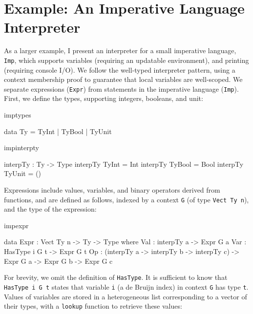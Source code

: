 \section{Example: An Imperative Language Interpreter}

\newcommand{\Imp}{\texttt{Imp}}

\label{sect:impint}

As a larger example, I present an interpreter for 
a small imperative language, \Imp{}, which supports variables
(requiring an updatable environment), 
and printing (requiring console I/O).
We follow the well-typed interpreter pattern, using a context membership
proof to guarantee that local variables are well-scoped. 
%
We separate expressions (\texttt{Expr}) from statements in the imperative
language (\texttt{Imp}). First, we define the types, supporting integers,
booleans, and unit:

\begin{SaveVerbatim}{imptypes}

data Ty = TyInt | TyBool | TyUnit 

\end{SaveVerbatim}

\begin{SaveVerbatim}{impinterpty}

interpTy : Ty -> Type
interpTy TyInt  = Int
interpTy TyBool = Bool
interpTy TyUnit = ()

\end{SaveVerbatim}

\noindent
Expressions include values, variables, and binary operators derived from 
\Idris{} functions, and are defined as follows, indexed by a context
\texttt{G} (of type \texttt{Vect Ty n}),
and the type of the expression:

\begin{SaveVerbatim}{impexpr}

data Expr : Vect Ty n -> Ty -> Type where
     Val : interpTy a -> Expr G a
     Var : HasType i G t -> Expr G t
     Op  : (interpTy a -> interpTy b -> interpTy c) ->
            Expr G a -> Expr G b -> Expr G c

\end{SaveVerbatim}

\noindent
For brevity, we omit the definition of \texttt{HasType}. It is sufficient to
know that \texttt{HasType i G t} states that variable \texttt{i} (a de Bruijn
index) in context \texttt{G} has type \texttt{t}.
Values of variables are stored in a heterogeneous list
corresponding to a vector of their types, with a \texttt{lookup} function
to retrieve these values:

